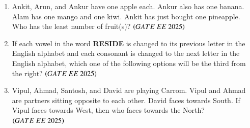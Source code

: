 \documentclass[journal,12pt,onecolumn]{IEEEtran}
\theoremstyle{remark}
\begin{document}
\begin{enumerate}
\item Ankit, Arun, and Ankur have one apple each. Ankur also has one banana. Alam has one mango and one kiwi. Ankit has just bought one pineapple. \\
Who has the least number of fruit(s)?
\hfill $\left(GATE\ EE\ 2025\right)$
\begin{enumerate}
\end{enumerate}

\item If each vowel in the word \textbf{RESIDE} is changed to its previous letter in the English alphabet and each consonant is changed to the next letter in the English alphabet, which one of the following options will be the third from the right?
\hfill $\left(GATE\ EE\ 2025\right)$
\begin{enumerate}
\end{enumerate}

\item Vipul, Ahmad, Santosh, and David are playing Carrom. Vipul and Ahmad are partners sitting opposite to each other. David faces towards South. If Vipul faces towards West, then who faces towards the North?
\hfill $\left(GATE\ EE\ 2025\right)$
\begin{enumerate}
\end{enumerate}


\end{enumerate}
\end{document}
